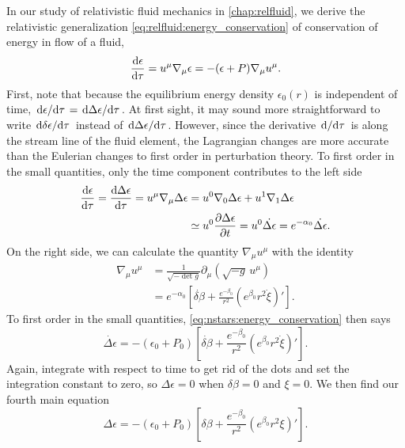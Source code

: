In our study of relativistic fluid mechanics in \cref{chap:relfluid}, we derive the relativistic generalization \eqref{eq:relfluid:energy_conservation} of conservation of energy in flow of a fluid,
\begin{equation}
	\odv{\epsilon}{\tau} = u^\mu \nabla_\mu \epsilon = -(\epsilon+P) \nabla_\mu u^\mu  .
\label{eq:nstars:energy_conservation}
\end{equation}
First, note that because the equilibrium energy density $\epsilon_0(r)$ is independent of time, $\odv{\epsilon}/{\tau} = \odv{\Delta \epsilon}/{\tau}$.
At first sight, it may sound more straightforward to write $\odv{\delta \epsilon}/{\tau}$ instead of $\odv{\Delta \epsilon}/{\tau}$.
However, since the derivative $\odv{}/{\tau}$ is along the stream line of the fluid element, the Lagrangian changes are more accurate than the Eulerian changes to first order in perturbation theory.
To first order in the small quantities, only the time component contributes to the left side
\begin{equation}
\begin{split}
	\odv{\epsilon}{\tau} =
	\odv{\Delta \epsilon}{\tau} =
	u^\mu \nabla_\mu \Delta \epsilon &=
	u^0 \nabla_0 \Delta \epsilon + u^1 \nabla_1 \Delta \epsilon \\
	&\taylor u^0 \pdv{\Delta \epsilon}{t} = u^0 \dot{\Delta \epsilon} =
	e^{-\alpha_0} \dot{\Delta \epsilon} .
\end{split}
\end{equation}
On the right side, we can calculate the quantity $\nabla_\mu u^\mu$ with the identity
\begin{equation}
\begin{split}
	\nabla_\mu u^\mu &= \frac{1}{\sqrt{-\det{g}}} \partial_\mu \left( \sqrt{-g} \, u^\mu \right) \\
	                 &= e^{-\alpha_0} \left[ \dot{\delta\beta} + \frac{e^{-\beta_0}}{r^2} \left( e^{\beta_0} r^2 \dot\xi \right)' \right] .
\end{split}
\end{equation}
To first order in the small quantities, \cref{eq:nstars:energy_conservation} then says
\begin{equation}
	\dot{\Delta \epsilon} = - \left( \epsilon_0 + P_0 \right) \left[ \dot{\delta\beta} + \frac{e^{-\beta_0}}{r^2} \left( e^{\beta_0} r^2 \dot\xi \right)' \right] .
\end{equation}
Again, integrate with respect to time to get rid of the dots and set the integration constant to zero, so $\Delta \epsilon = 0$ when $\delta \beta = 0$ and $\xi = 0$.
We then find our fourth main equation
\begin{equation}
	\Delta \epsilon = - \left( \epsilon_0 + P_0 \right) \left[ \delta\beta + \frac{e^{-\beta_0}}{r^2} \left( e^{\beta_0} r^2 \xi \right)' \right] .
\label{eq:nstars:Delta_epsilon}
\end{equation}

